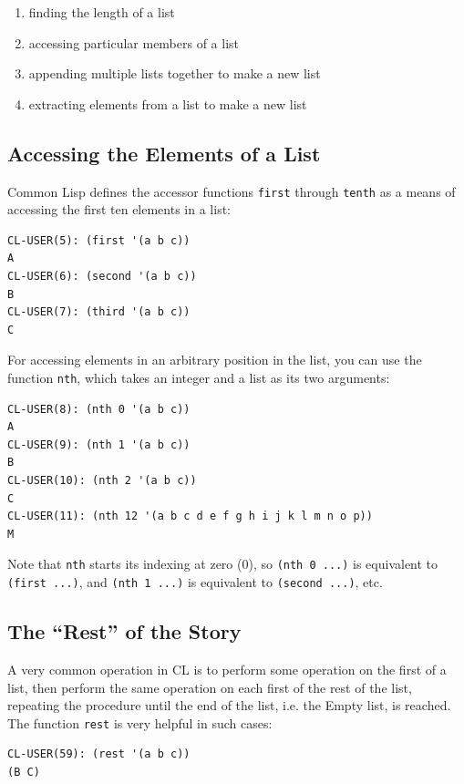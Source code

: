 \begin{enumerate}
\item finding the length of a list
\item accessing particular members of a list
\item appending multiple lists together to make a new list
\item extracting elements from a list to make a new list
\end{enumerate}

\subsection{Accessing the Elements of a List}

Common Lisp defines the accessor functions \texttt{first} through \texttt{tenth} as a means of accessing
the first ten elements in a list:

\begin{verbatim}
CL-USER(5): (first '(a b c))
A
CL-USER(6): (second '(a b c))
B
CL-USER(7): (third '(a b c))
C
\end{verbatim}

For accessing elements in an arbitrary position in the list, you can use the function \texttt{nth},
which takes an integer and a list as its two arguments:

\begin{verbatim}
CL-USER(8): (nth 0 '(a b c))
A
CL-USER(9): (nth 1 '(a b c))
B
CL-USER(10): (nth 2 '(a b c))
C
CL-USER(11): (nth 12 '(a b c d e f g h i j k l m n o p))
M
\end{verbatim}

Note that \texttt{nth} starts its indexing at zero (0), so \texttt{(nth 0 ...)} is equivalent to \texttt{(first ...)},
and \texttt{(nth 1 ...)} is equivalent to \texttt{(second ...)}, etc.

\subsection{The ``Rest'' of the Story}

A very common operation in CL is to perform some operation on the first of a list, then
perform the same operation on each first of the rest of the list, repeating the procedure
until the end of the list, i.e. the Empty list, is reached. The function \texttt{rest} is very helpful
in such cases:

\begin{verbatim}
CL-USER(59): (rest '(a b c))
(B C)
\end{verbatim}

